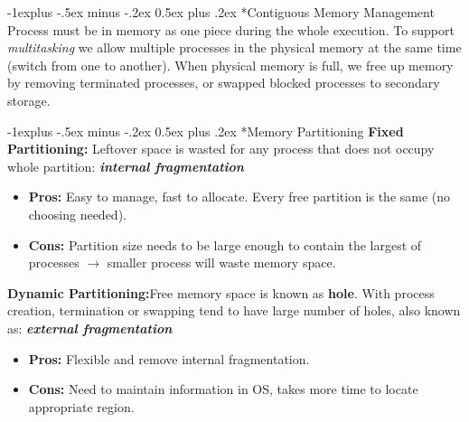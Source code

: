 \documentclass[10pt,landscape]{article}
\makeatletter
\renewcommand{\subsection}{\@startsection{section}{1}{0mm}%
                                {-1ex plus -.5ex minus -.2ex}%
                                {0.5ex plus .2ex}%
                                {\normalfont\large\bfseries}}
\renewcommand{\subsection}{\@startsection{subsection}{2}{0mm}%
                                {-1explus -.5ex minus -.2ex}%
                                {0.5ex plus .2ex}%
                                {\normalfont\normalsize\bfseries}}
\makeatother
\begin{document}
\begin{multicols*}{3}
\subsection*{Contiguous Memory Management}
Process must be in memory as one piece during the whole execution. To support \textit{multitasking}
we allow multiple processes in the physical memory at the same time (switch from one to another). When physical
memory is full, we free up memory by removing terminated processes, or swapped blocked processes to secondary storage.

\subsection*{Memory Partitioning}
\textbf{Fixed Partitioning:} Leftover space is wasted for any process that does not occupy whole partition: \textit{\textbf{internal fragmentation}}\\
\begin{itemize}[topsep=0pt,noitemsep,wide=0pt, leftmargin=\dimexpr{} + 2\relax]
    \item \textbf{Pros:} Easy to manage, fast to allocate. Every free partition is the same (no choosing needed).
    \item \textbf{Cons:} Partition size needs to be large enough to contain the largest of processes $\rightarrow$ smaller process will waste memory space.
\end{itemize}

\textbf{Dynamic Partitioning:}Free memory space is known as \textbf{hole}. With process creation, termination or swapping tend to have large number of holes, also known as: \textit{\textbf{external fragmentation}}\\
\begin{itemize}[topsep=0pt,noitemsep,wide=0pt, leftmargin=\dimexpr{} + 2\relax]
    \item \textbf{Pros:} Flexible and remove internal fragmentation.
    \item \textbf{Cons:} Need to maintain information in OS, takes more time to locate appropriate region.
\end{itemize}


\end{multicols*}
\end{document}
